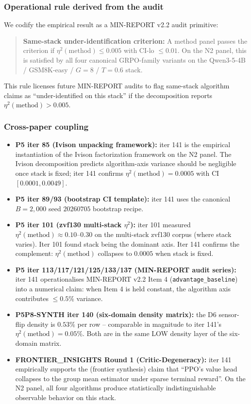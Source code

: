 \documentclass{article}  \usepackage[preprint,nonatbib]{neurips_2026} \usepackage[numbers]{natbib}
\begin{document}
\subsubsection{Operational rule derived from the audit}

We codify the empirical result as a MIN-REPORT v2.2 audit primitive:

\begin{quote}
\textbf{Same-stack under-identification criterion:} A method panel passes
the criterion if $\eta^2(\text{method}) \leq 0.005$ with CI-lo $\leq 0.01$.
On the N2 panel, this is satisfied by all four canonical GRPO-family
variants on the Qwen3-5-4B / GSM8K-easy / $G{=}8$ / $T{=}0.6$ stack.
\end{quote}

\noindent This rule licenses future MIN-REPORT audits to flag same-stack
algorithm claims as ``under-identified on this stack'' if the
decomposition reports $\eta^2(\text{method}) > 0.005$.

\subsubsection{Cross-paper coupling}

\begin{itemize}
\item \textbf{P5 iter 85 (Ivison unpacking framework):} iter 141 is the
empirical instantiation of the Ivison factorization framework on the N2
panel. The Ivison decomposition predicts algorithm-axis variance should
be negligible once stack is fixed; iter 141 confirms
$\eta^2(\text{method}) = 0.0005$ with CI $[0.0001, 0.0049]$.
\item \textbf{P5 iter 89/93 (bootstrap CI template):} iter 141 uses the
canonical $B{=}2{,}000$ seed $20260705$ bootstrap recipe.
\item \textbf{P5 iter 101 (zvf130 multi-stack $\eta^2$):} iter 101
measured $\eta^2(\text{method}) \approx 0.10$--$0.30$ on the multi-stack
zvf130 corpus (where stack varies). Iter 101 found stack being the
dominant axis. Iter 141 confirms the complement: $\eta^2(\text{method})$
collapses to $0.0005$ when stack is fixed.
\item \textbf{P5 iter 113/117/121/125/133/137 (MIN-REPORT audit series):}
iter 141 operationalises MIN-REPORT v2.2 Item 4 (\texttt{advantage\_baseline})
into a numerical claim: when Item 4 is held constant, the algorithm axis
contributes $\leq 0.5\%$ variance.
\item \textbf{P5P8-SYNTH iter 140 (six-domain density matrix):} the D6
sensor-flip density is $0.53\%$ per row -- comparable in magnitude to
iter 141's $\eta^2(\text{method}) = 0.05\%$. Both are in the same LOW
density layer of the six-domain matrix.
\item \textbf{FRONTIER\_INSIGHTS Round 1 (Critic-Degeneracy):} iter 141
empirically supports the (frontier synthesis) claim that ``PPO's value
head collapses to the group mean estimator under sparse terminal reward''.
On the N2 panel, all four algorithms produce statistically indistinguishable
observable behavior on this stack.
\end{itemize}
\end{document}
